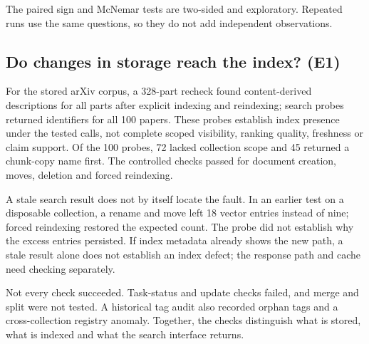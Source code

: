 The paired sign and McNemar tests are two-sided and exploratory. Repeated
runs use the same questions, so they do not add independent observations.

\subsection{Do changes in storage reach the index? (E1)}
\label{sec:e1}
\label{sec:e2}
\label{sec:exp-e1}
For the stored arXiv corpus, a 328-part recheck found content-derived
descriptions for all parts after explicit indexing and reindexing; search
probes returned identifiers for all 100 papers. These probes establish index
presence under the tested calls, not complete scoped visibility, ranking
quality, freshness or claim support. Of the 100
probes, 72 lacked collection scope and 45 returned a chunk-copy name first.
The controlled checks passed for document creation, moves, deletion and forced
reindexing.

A stale search result does not by itself locate the fault. In an earlier
test on a disposable collection, a rename and move left 18 vector
entries instead of nine; forced reindexing restored the expected count. The probe did not establish
why the excess entries persisted. If index metadata already shows the new path, a stale
result alone does not establish an index defect; the response path and
cache need checking separately.

Not every check succeeded. Task-status and update checks failed, and merge
and split were not tested. A historical tag audit also recorded orphan tags
and a cross-collection registry anomaly. Together, the checks distinguish
what is stored, what is indexed and what the search interface returns.
